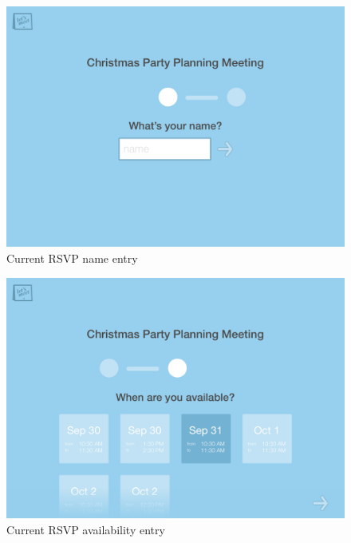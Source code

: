 \documentclass{sigchi}
\begin{document}
\begin{figure}
  \centering
  \includegraphics[width=1.75\columnwidth]{Mockup/RSVPEnterName}
  \caption{Current RSVP name entry}
\end{figure}

\begin{figure}
  \centering
  \includegraphics[width=1.75\columnwidth]{Mockup/RSVPEnterAvailability}
  \caption{Current RSVP availability entry}
\end{figure}
\end{document}
